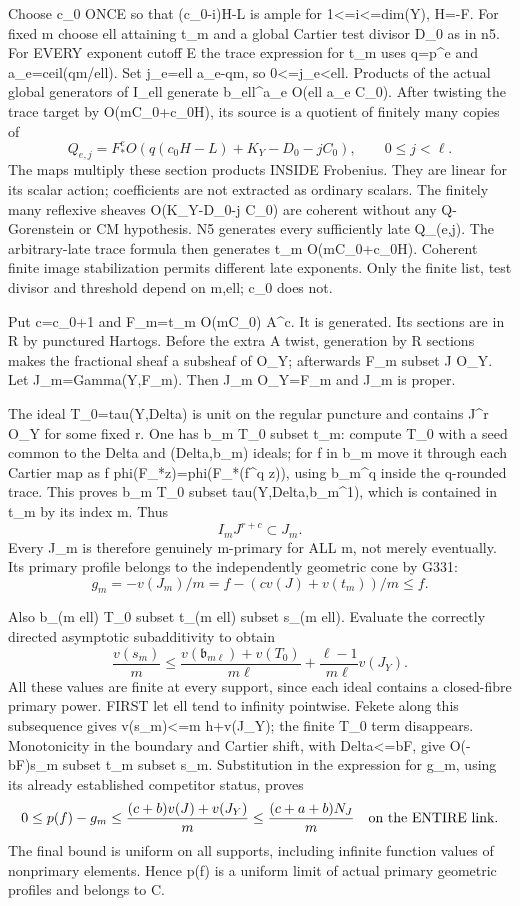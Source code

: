 \documentclass[11pt]{article}
\begin{document}
Choose c\_0 ONCE so that (c\_0-i)H-L is ample for 1<=i<=dim(Y), H=-F. For fixed m choose ell attaining t\_m and a global Cartier test divisor D\_0 as in n5. For EVERY exponent cutoff E the trace expression for t\_m uses q=p\textasciicircum{}e and a\_e=ceil(qm/ell). Set j\_e=ell a\_e-qm, so 0<=j\_e<ell. Products of the actual global generators of I\_ell generate b\_ell\textasciicircum{}a\_e O(ell a\_e C\_0). After twisting the trace target by O(mC\_0+c\_0H), its source is a quotient of finitely many copies of
\[
Q_{e,j}=F_*^e O(q(c_0H-L)+K_Y-D_0-j C_0),\qquad 0\le j<\ell.
\]
The maps multiply these section products INSIDE Frobenius. They are linear for its scalar action; coefficients are not extracted as ordinary scalars. The finitely many reflexive sheaves O(K\_Y-D\_0-j C\_0) are coherent without any Q-Gorenstein or CM hypothesis. N5 generates every sufficiently late Q\_(e,j). The arbitrary-late trace formula then generates t\_m O(mC\_0+c\_0H). Coherent finite image stabilization permits different late exponents. Only the finite list, test divisor and threshold depend on m,ell; c\_0 does not.

Put c=c\_0+1 and F\_m=t\_m O(mC\_0) A\textasciicircum{}c. It is generated. Its sections are in R by punctured Hartogs. Before the extra A twist, generation by R sections makes the fractional sheaf a subsheaf of O\_Y; afterwards F\_m subset J O\_Y. Let J\_m=Gamma(Y,F\_m). Then J\_m O\_Y=F\_m and J\_m is proper.

The ideal T\_0=tau(Y,Delta) is unit on the regular puncture and contains J\textasciicircum{}r O\_Y for some fixed r. One has b\_m T\_0 subset t\_m: compute T\_0 with a seed common to the Delta and (Delta,b\_m) ideals; for f in b\_m move it through each Cartier map as f phi(F\_*z)=phi(F\_*(f\textasciicircum{}q z)), using b\_m\textasciicircum{}q inside the q-rounded trace. This proves b\_m T\_0 subset tau(Y,Delta,b\_m\textasciicircum{}1), which is contained in t\_m by its index m. Thus
\[
I_m J^{r+c}\subset J_m.
\]
Every J\_m is therefore genuinely m-primary for ALL m, not merely eventually. Its primary profile belongs to the independently geometric cone by G331:
\[
g_m=-v(J_m)/m=f-(c v(J)+v(t_m))/m\le f.
\]

Also b\_(m ell) T\_0 subset t\_(m ell) subset s\_(m ell). Evaluate the correctly directed asymptotic subadditivity to obtain
\[
\frac{v(s_m)}m\le
\frac{v(\mathfrak b_{m\ell})+v(T_0)}{m\ell}
+\frac{\ell-1}{m\ell}v(J_Y).
\]
All these values are finite at every support, since each ideal contains a closed-fibre primary power. FIRST let ell tend to infinity pointwise. Fekete along this subsequence gives v(s\_m)<=m h+v(J\_Y); the finite T\_0 term disappears. Monotonicity in the boundary and Cartier shift, with Delta<=bF, give O(-bF)s\_m subset t\_m subset s\_m. Substitution in the expression for g\_m, using its already established competitor status, proves
\[
0\le p(f)-g_m\le
\frac{(c+b)v(J)+v(J_Y)}m
\le\frac{(c+a+b)N_J}{m}
\quad\hbox{on the ENTIRE link.}
\]
The final bound is uniform on all supports, including infinite function values of nonprimary elements. Hence p(f) is a uniform limit of actual primary geometric profiles and belongs to C.
\end{document}
